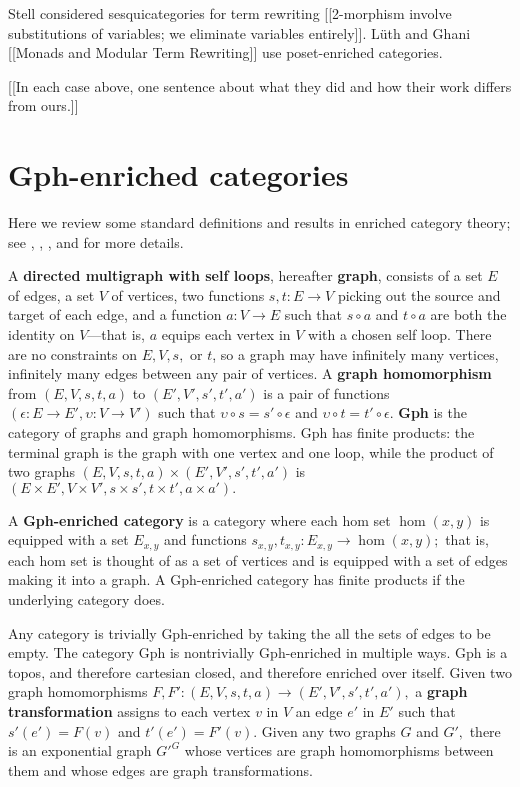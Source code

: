 \documentclass[a4paper,UKenglish]{lipics-v2016}
\newcommand{\maps}{\colon}
\begin{document}
Stell \cite{Stell}
considered sesquicategories for term rewriting [[2-morphism involve substitutions of variables; we eliminate variables entirely]].  L\"uth and Ghani [[Monads and Modular Term Rewriting]] use poset-enriched categories.

[[In each case above, one sentence about what they did and how their work differs from ours.]]

\section{Gph-enriched categories}
Here we review some standard definitions and results in enriched category theory; see \cite{CIS-335497}, \cite{Power99EnrichedLawvereTheories}, \cite{DBLP:journals/acs/LackR11}, and \cite{Trimble} for more details.

A {\bf directed multigraph with self loops}, hereafter {\bf graph}, consists of a set $E$ of edges, a set $V$ of vertices, two functions $s,t\maps E \to V$ picking out the source and target of each edge, and a function $a\maps V \to E$ such that $s\circ a$ and $t \circ a$ are both the identity on $V$---that is, $a$ equips each vertex in $V$ with a chosen self loop.  There are no constraints on $E, V, s,$ or $t$, so a graph may have infinitely many vertices, infinitely many edges between any pair of vertices.  A {\bf graph homomorphism} from $(E, V, s, t, a)$ to $(E', V', s', t', a')$ is a pair of functions $(\epsilon\maps E \to E', \upsilon\maps V \to V')$ such that $\upsilon\circ s = s' \circ \epsilon$ and $\upsilon\circ t = t' \circ \epsilon$.  {\bf Gph} is the category of graphs and graph homomorphisms.  Gph has finite products: the terminal graph is the graph with one vertex and one loop, while the product of two graphs $(E, V, s, t, a) \times (E', V', s', t', a')$ is $(E \times E', V \times V', s \times s', t\times t', a \times a').$

A {\bf Gph-enriched category} is a category where each hom set $\hom(x,y)$ is equipped with a set $E_{x,y}$ and functions $s_{x,y}, t_{x,y}\maps E_{x,y} \to \hom(x,y);$ that is, each hom set is thought of as a set of vertices and is equipped with a set of edges making it into a graph.  A Gph-enriched category has finite products if the underlying category does.

Any category is trivially Gph-enriched by taking the all the sets of edges to be empty.  The category Gph is nontrivially Gph-enriched in multiple ways.  Gph is a topos, and therefore cartesian closed, and therefore enriched over itself.  Given two graph homomorphisms $F, F'\maps (E, V, s, t, a) \to (E', V', s', t', a'),$ a {\bf graph transformation} assigns to each vertex $v$ in $V$ an edge $e'$ in $E'$ such that $s'(e') = F(v)$ and $t'(e') = F'(v).$  Given any two graphs $G$ and $G',$ there is an exponential graph $G'^G$ whose vertices are graph homomorphisms between them and whose edges are graph transformations.
\end{document}
